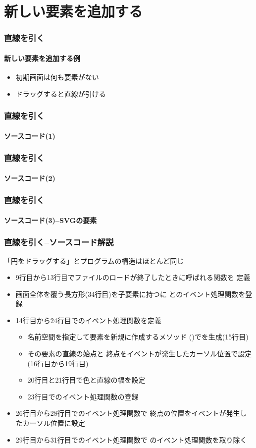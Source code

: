 

\frame{\maketitle}
 \section{新しい要素を追加する}
\begin{frame}[containsverbatim]
 \frametitle{直線を引く}
 \framesubtitle{新しい要素を追加する例}
 \begin{itemize}
  \item 初期画面は何も要素がない
  \item ドラッグすると直線が引ける
 \end{itemize}
 \end{frame}
\begin{frame}[containsverbatim]
 \frametitle{直線を引く}
 \framesubtitle{ソースコード(1)}
\end{frame}
\begin{frame}[containsverbatim]
 \frametitle{直線を引く}
 \framesubtitle{ソースコード(2)}
\end{frame}
\begin{frame}[containsverbatim]
 \frametitle{直線を引く}
 \framesubtitle{ソースコード(3)--SVGの要素}
\end{frame}
\begin{frame}[containsverbatim]
 \frametitle{直線を引く--ソースコード解説}
 「円をドラッグする」とプログラムの構造はほとんど同じ
 \begin{itemize}
  \item 9行目から13行目でファイルのロードが終了したときに呼ばれる関数を
        定義
  \item 画面全体を覆う長方形(34行目)を子要素に持つに
           とのイベント処理関数を登録
  \item 14行目から24行目でのイベント処理関数を定義
    \begin{itemize}
     \item 名前空間を指定して要素を新規に作成するメソッド
           ()でを生成(15行目)
     \item その要素の直線の始点と
           終点をイベントが発生したカーソル位置で設定(16行目から19行目)
     \item 20行目と21行目で色と直線の幅を設定
     \item 23行目でのイベント処理関数の登録
    \end{itemize}
  \item 26行目から28行目でのイベント処理関数で
        終点の位置をイベントが発生したカーソル位置に設定
  \item 29行目から31行目でのイベント処理関数で
        のイベント処理関数を取り除く
 \end{itemize}
\end{frame}
